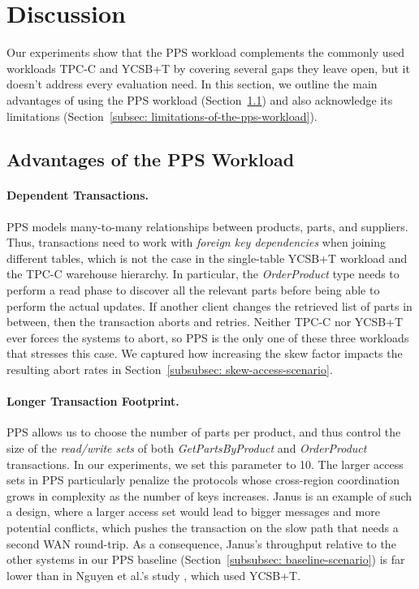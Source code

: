 \section{Discussion}
\label{sec: discussion}
Our experiments show that the PPS workload complements the commonly used workloads TPC-C and YCSB+T by covering several gaps they leave open, but it doesn't address every evaluation need. In this section, we outline the main advantages of using the PPS workload (Section~\ref{subsec: advantages-of-the-pps-workload}) and also acknowledge its limitations (Section~\ref{subsec: limitations-of-the-pps-workload}).

\subsection{Advantages of the PPS Workload}
\label{subsec: advantages-of-the-pps-workload}
\paragraph{Dependent Transactions.}
PPS models many-to-many relationships between products, parts, and suppliers. Thus, transactions need to work with \textit{foreign key dependencies} when joining different tables, which is not the case in the single-table YCSB+T workload and the TPC-C warehouse hierarchy. In particular, the \textit{OrderProduct} type needs to perform a read phase to discover all the relevant parts before being able to perform the actual updates. If another client changes the retrieved list of parts in between, then the transaction aborts and retries. Neither TPC-C nor YCSB+T ever forces the systems to abort, so PPS is the only one of these three workloads that stresses this case. We captured how increasing the skew factor impacts the resulting abort rates in Section~\ref{subsubsec: skew-access-scenario}.

\paragraph{Longer Transaction Footprint.}
PPS allows us to choose the number of parts per product, and thus control the size of the \textit{read/write sets} of both \textit{GetPartsByProduct} and \textit{OrderProduct} transactions. In our experiments, we set this parameter to 10. The larger access sets in PPS particularly penalize the protocols whose cross-region coordination grows in complexity as the number of keys increases. Janus is an example of such a design, where a larger access set would lead to bigger messages and more potential conflicts, which pushes the transaction on the slow path that needs a second WAN round-trip. As a consequence, Janus's throughput relative to the other systems in our PPS baseline (Section~\ref{subsubsec: baseline-scenario}) is far lower than in Nguyen et al.'s study \cite{nguyen2023detock}, which used YCSB+T.

